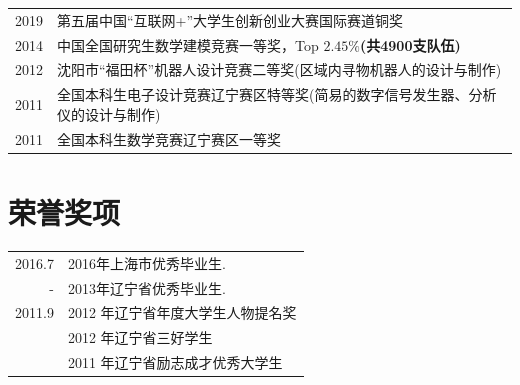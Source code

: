 \documentclass[a4paper,10pt]{article}
\begin{document}
\begin{longtable}[H]{r|p{13.5cm}}
  \hspace{20pt} \textsc{2019} & 第五届中国“互联网+”大学生创新创业大赛国际赛道铜奖 \\

  \textsc{2014} & 中国全国研究生数学建模竞赛一等奖，Top \textbf{$\mathbf{2.45\%}$(共4900支队伍)}\\

\textsc{2012} & 沈阳市“福田杯”机器人设计竞赛二等奖(区域内寻物机器人的设计与制作)\\
  \textsc{2011} & 全国本科生电子设计竞赛辽宁赛区特等奖(简易的数字信号发生器、分析仪的设计与制作)\\
  \textsc{2011} & 全国本科生数学竞赛辽宁赛区一等奖 \\
\end{longtable}

\section{荣誉奖项}
\begin{longtable}[H]{r|p{13.5cm}}
  \textsc{2016.7} & 2016年上海市优秀毕业生. \\
  \textsc{-}& 2013年辽宁省优秀毕业生. \\
  \textsc{2011.9} & 2012 年辽宁省年度大学生人物提名奖 \\
                    & 2012 年辽宁省三好学生\\
                    & 2011 年辽宁省励志成才优秀大学生 \\
\end{longtable}


\end{document}
